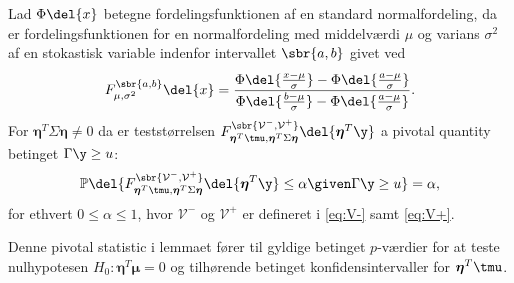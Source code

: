 \begin{lem}  \label{lem:lem2}
Lad \(\Phi \del{x}\) betegne fordelingsfunktionen af en standard normalfordeling, da er fordelingsfunktionen for en normalfordeling med middelværdi \(\mu\) og varians \(\sigma^2\) af en stokastisk variable indenfor intervallet \(\sbr{a,b}\) givet ved
\begin{align*}
F_{\mu, \sigma^2}^{\sbr{a,b}} \del{x} = \frac{\Phi\del{\frac{x-\mu}{\sigma}} - \Phi\del{\frac{a-\mu}{\sigma}}}{\Phi\del{\frac{b-\mu}{\sigma}} - \Phi\del{\frac{a-\mu}{\sigma}}}.
\end{align*}
For \(\boldsymbol{\eta}^T \Sigma \boldsymbol{\eta} \neq 0\) da er teststørrelsen \(F_{\boldsymbol{\eta}^T \tmu, \boldsymbol{\eta}^T \Sigma \boldsymbol{\eta}}^{\sbr{\mathcal{V}^-,\mathcal{V}^+}} \del{\boldsymbol{\eta}^T \y} \) a pivotal quantity betinget \(\Gamma \y \geq u\):
\begin{align*}
\mathbb{P} \del{F_{\boldsymbol{\eta}^T \tmu, \boldsymbol{\eta}^T \Sigma \boldsymbol{\eta}}^{\sbr{\mathcal{V}^-,\mathcal{V}^+}} \del{\boldsymbol{\eta}^T \y} \leq \alpha \given \Gamma \y \geq u} = \alpha, 
\end{align*}
for ethvert \(0 \leq \alpha \leq 1\), hvor \(\mathcal{V}^-\) og \(\mathcal{V}^+\) er defineret i \eqref{eq:V-} samt \eqref{eq:V+}. 
\end{lem}
%
Denne pivotal statistic i lemmaet fører til gyldige betinget \(p\)-værdier for at teste nulhypotesen \(H_0: \boldsymbol{\eta}^T \boldsymbol{\mu}=0\) og tilhørende betinget konfidensintervaller for \(\boldsymbol{\eta}^T \tmu\).

